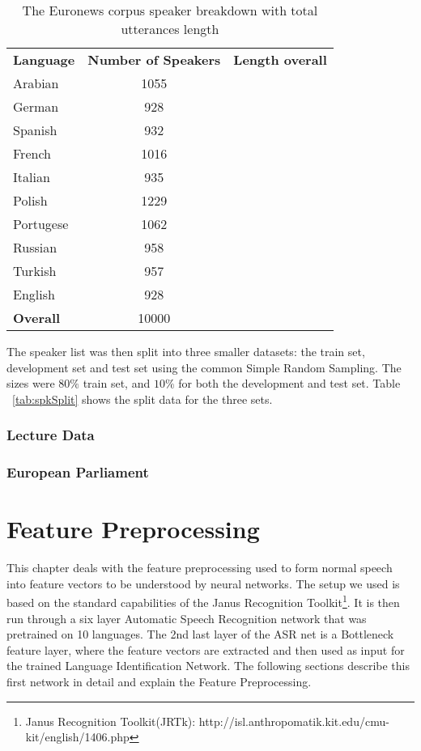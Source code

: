 \begin{table}[h]
\label{tab:spkData}
\centering
\begin{tabular}{| l | c | r | }
	\hline
	\textbf{Language} & \textbf{Number of Speakers} & \textbf{Length overall} \\
	Arabian & 1055 & \\
	German & 928 & \\
	Spanish & 932 & \\
	French & 1016 & \\
	Italian & 935 & \\
	Polish & 1229 & \\
	Portugese & 1062 & \\
	Russian & 958 & \\
	Turkish & 957 & \\
	English & 928 & \\
	\hline
	\textbf{Overall} & 10000 & \\
	\hline
	
\end{tabular}
\caption{The Euronews corpus speaker breakdown with total utterances length}
\end{table}

The speaker list was then split into three smaller datasets: the train set, development set and test set using the common Simple Random Sampling. The sizes were \(80\%\) train set, and \(10\%\) for both the development and test set. Table ~\ref{tab:spkSplit} shows the split data for the three sets.


\subsection{Lecture Data}
\label{sec:LITasks:Lecture}

\subsection{European Parliament}
\label{sec:LITasks:EU}

\chapter{Feature Preprocessing}
\label{ch:FP}

This chapter deals with the feature preprocessing used to form normal speech into feature vectors to be understood by neural networks. The setup we used is based on the standard capabilities of the Janus Recognition Toolkit\footnote{Janus Recognition Toolkit(JRTk): http://isl.anthropomatik.kit.edu/cmu-kit/english/1406.php}. It is then run through a six layer Automatic Speech Recognition network that was pretrained on 10 languages. The 2nd last layer of the ASR net is a Bottleneck feature layer, where the feature vectors are extracted and then used as input for the trained Language Identification Network. The following sections describe this first network in detail and explain the Feature Preprocessing.

